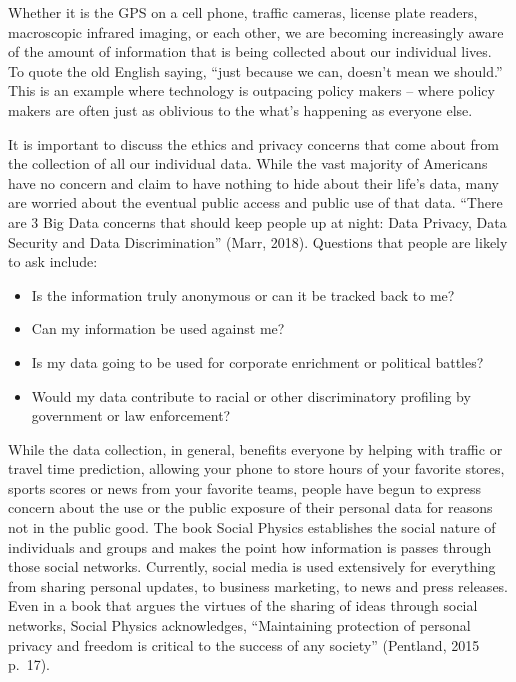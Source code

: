 \documentclass[]{book}
\begin{document}
Whether it is the GPS on a cell phone, traffic cameras, license plate readers, macroscopic infrared imaging, or each other, we are becoming increasingly aware of the amount of information that is being collected about our individual lives. To quote the old English saying, ``just because we can, doesn't mean we should.'' This is an example where technology is outpacing policy makers -- where policy makers are often just as oblivious to the what's happening as everyone else.

It is important to discuss the ethics and privacy concerns that come about from the collection of all our individual data. While the vast majority of Americans have no concern and claim to have nothing to hide about their life's data, many are worried about the eventual public access and public use of that data. ``There are 3 Big Data concerns that should keep people up at night: Data Privacy, Data Security and Data Discrimination'' (Marr, 2018). Questions that people are likely to ask include:

\begin{itemize}
\item
  Is the information truly anonymous or can it be tracked back to me?
\item
  Can my information be used against me?
\item
  Is my data going to be used for corporate enrichment or political battles?
\item
  Would my data contribute to racial or other discriminatory profiling by government or law enforcement?
\end{itemize}

While the data collection, in general, benefits everyone by helping with traffic or travel time prediction, allowing your phone to store hours of your favorite stores, sports scores or news from your favorite teams, people have begun to express concern about the use or the public exposure of their personal data for reasons not in the public good. The book Social Physics establishes the social nature of individuals and groups and makes the point how information is passes through those social networks. Currently, social media is used extensively for everything from sharing personal updates, to business marketing, to news and press releases. Even in a book that argues the virtues of the sharing of ideas through social networks, Social Physics acknowledges, ``Maintaining protection of personal privacy and freedom is critical to the success of any society'' (Pentland, 2015 p.~17).
\end{document}
